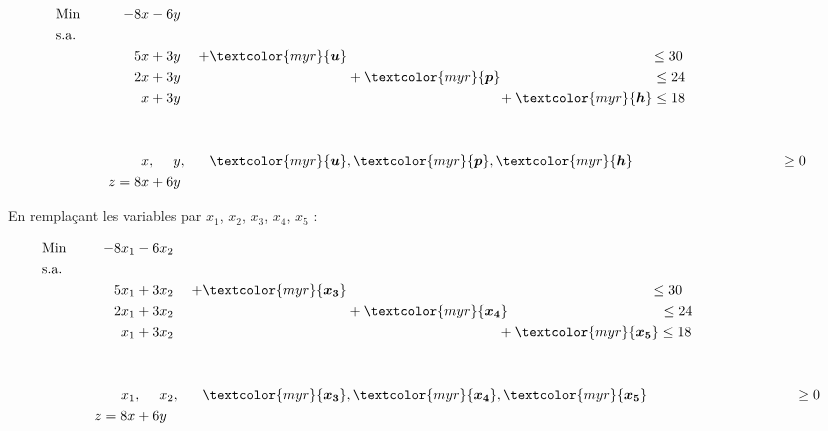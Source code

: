 \documentclass{report}
\begin{document}
\begin{multicols*}{2}
\begin{alignat*}{4}
    &\text{Min} &\quad -8x & - 6y &\\
    &\text{s.a.} \\
    &\phantom{\text{Min}} &\quad 5x & + 3y & 
    + \textcolor{myr}{\boldsymbol{ u}}& 
    \phantom{+ \; \textcolor{myr}{\boldsymbol{ p}}} 
    \phantom{+ \;\textcolor{myr}{\boldsymbol{ h}}} \leq 30 & 
    \\
    &\phantom{\text{Min}} &\quad 2x & + 3y & 
    \phantom{+\textcolor{myr}{\boldsymbol{ u}}}& + 
    \textcolor{myr}{\boldsymbol{ p}} 
    \phantom{+\;\textcolor{myr}{\boldsymbol{ h}}} 
    \leq 24 & \\
    &\phantom{\text{Min}} &\quad x & + 3y & 
    \phantom{+\textcolor{myr}{\boldsymbol{ u}}}&  
    \phantom{+\;\textcolor{myr}{\boldsymbol{ p}}} 
    +\textcolor{myr}{\boldsymbol{ h}} \leq 18 & \\ 
    \\ 
    \\
                &\phantom{\text{Min}} &\quad x &, \phantom{+3} y,& 
    \textcolor{myr}{\boldsymbol{u}}&,
    \textcolor{myr}{\boldsymbol{ p}}, 
    \textcolor{myr}{\boldsymbol{ h}}
    \phantom{+\textcolor{myr}{\boldsymbol{ p}}} \geq 0 & \\
    & \phantom{\text{Min}} &\quad z = 8x & + 6y &
\end{alignat*}


En remplaçant les variables par $x_1$, $x_2$, $x_3$, $x_4$, $x_5$ :

\begin{alignat*}{4}
    &\text{Min} &\quad -8x_1 & - 6x_2 &\\
    &\text{s.a.} \\
    &\phantom{\text{Min}} &\quad 5x_1 & + 3x_2 & 
    + \textcolor{myr}{\boldsymbol{ x_3}}& 
    \phantom{+ \; \textcolor{myr}{\boldsymbol{ p}}} 
    \phantom{+ \;\textcolor{myr}{\boldsymbol{ h}}} \leq 30 & 
    \\
    &\phantom{\text{Min}} &\quad 2x_1 & + 3x_2 & 
    \phantom{+\textcolor{myr}{\boldsymbol{ u}}}& + 
    \textcolor{myr}{\boldsymbol{ x_4}} 
    \phantom{+\;\textcolor{myr}{\boldsymbol{ h}}} 
    \leq 24 & \\
    &\phantom{\text{Min}} &\quad x_1 & + 3x_2 & 
    \phantom{+\textcolor{myr}{\boldsymbol{ u}}}&  
    \phantom{+\;\textcolor{myr}{\boldsymbol{ p}}} 
    +\textcolor{myr}{\boldsymbol{ x_5}} \leq 18 & \\ 
    \\ 
    \\
                &\phantom{\text{Min}} &\quad x_1 &, \phantom{+3} x_2,& 
    \textcolor{myr}{\boldsymbol{x_3}}&,
    \textcolor{myr}{\boldsymbol{ x_4}}, 
    \textcolor{myr}{\boldsymbol{ x_5}}
    \phantom{+\textcolor{myr}{\boldsymbol{ p}}} \geq 0 & \\
    & \phantom{\text{Min}} &\quad z = 8x & + 6y &
\end{alignat*}


\end{multicols*}
\end{document}
